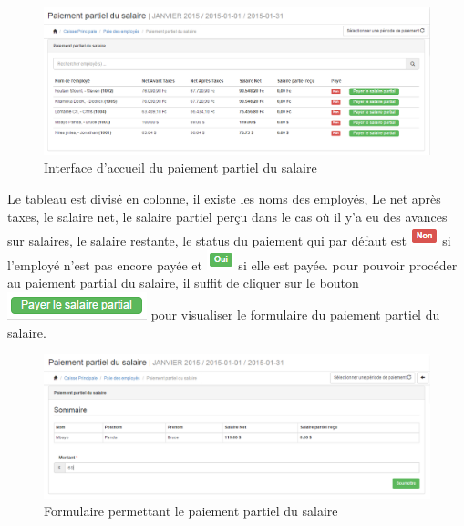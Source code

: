 \documentclass[12pt,a4paper]{report}
\begin{document}
\begin{figure}[h]
\begin{center}
\includegraphics[width=14cm]{pic/PaiePartSalaire.png}
\end{center}
\caption{Interface d'accueil du paiement partiel du salaire}
\label{Interface d'accueil du paiement partiel du salaire}
\end{figure}

Le tableau est divisé en colonne, il existe les noms des employés, Le net après taxes, le salaire net, le salaire partiel perçu dans le cas où il y'a eu des avances sur salaires, le salaire restante, le status du paiement qui par défaut est \includegraphics[scale=0.7]{pic/NonTaxes.png} si l'employé n'est pas encore payée et \includegraphics[scale=0.7]{pic/OuiTaxes.png} si elle est payée. pour pouvoir procéder au paiement partial du salaire, il suffit de cliquer sur le bouton  \includegraphics[scale=0.7]{pic/salaryPartial.png} pour visualiser le formulaire du paiement partiel du salaire.

\begin{figure}[h]
\begin{center}
\includegraphics[width=14cm]{pic/FormPartPaiement.png}
\end{center}
\caption{Formulaire permettant le paiement partiel du salaire}
\label{Formulaire permettant le paiement partiel du salaire}
\end{figure}
\end{document}
